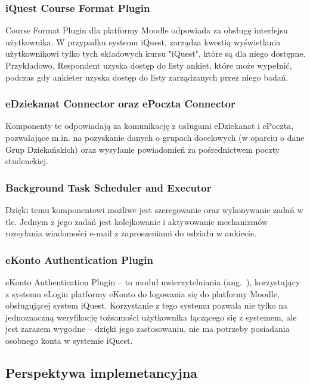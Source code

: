 \subsubsection{iQuest Course Format Plugin}
\label{Chapter5322}

Course Format Plugin dla platformy Moodle odpowiada za obsługę interfejsu użytkownika. W przypadku systemu iQuest, zarządza kwestią wyświetlania użytkownikowi tylko tych składowych kursu "iQuest", które są dla niego dostępne. Przykładowo, Respondent uzyska dostęp do listy ankiet, które może wypełnić, podczas gdy ankieter uzyska dostęp do listy zarządzanych przez niego badań.

\subsubsection{eDziekanat Connector oraz ePoczta Connector}
\label{Chapter5323}

Komponenty te odpowiadają za komunikację z usługami eDziekanat i ePoczta, pozwalające m.in. na pozyskanie danych o grupach docelowych (w oparciu o dane Grup Dziekańskich) oraz wysyłanie powiadomień za pośrednictwem poczty studenckiej.

\subsubsection{Background Task Scheduler and Executor}
\label{Chapter5324}

Dzięki temu komponentowi możliwe jest szeregowanie oraz wykonywanie zadań w tle. Jednym z jego zadań jest kolejkowanie i aktywowanie mechanizmów rozsyłania wiadomości e-mail z zaproszeniami do udziału w ankiecie.

\subsubsection{eKonto Authentication Plugin}
\label{Chapter5325}

eKonto Authentication Plugin -- to moduł uwierzytelniania (ang.~), korzystający z systemu eLogin platformy eKonto do logowania się do platformy Moodle, obsługującej system iQuest. Korzystanie z tego systemu pozwala nie tylko na jednoznaczną weryfikację tożsamości użytkownika łączącego się z systemem, ale jest zarazem wygodne -- dzięki jego zastosowaniu, nie ma potrzeby posiadania osobnego konta w systemie iQuest.

\subsection{Perspektywa implemetancyjna}
\label{Chapter533}

